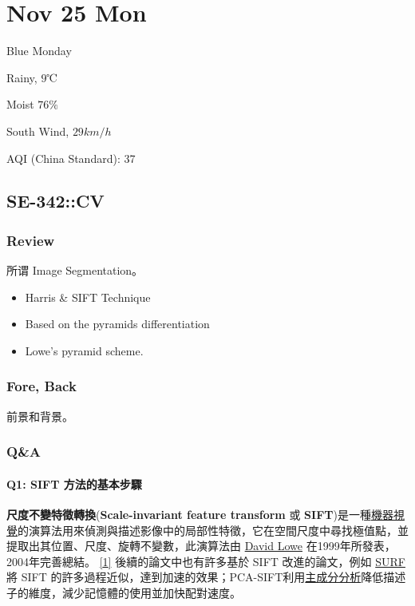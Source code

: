 \documentclass[
]{article}
\date{}
\begin{document}
\hypertarget{header-n0}{%
\section{Nov 25 Mon}\label{header-n0}}

Blue Monday

Rainy, \(9\)℃

Moist \(76\%\)

South Wind, \(29km/h\)

AQI (China Standard): 37

\hypertarget{header-n7}{%
\subsection{SE-342::CV}\label{header-n7}}

\hypertarget{header-n8}{%
\subsubsection{Review}\label{header-n8}}

所谓 Image Segmentation。

\begin{itemize}
\item
  Harris \& SIFT Technique
\item
  Based on the pyramids differentiation
\item
  Lowe's pyramid scheme.
\end{itemize}

\hypertarget{header-n17}{%
\subsubsection{Fore, Back}\label{header-n17}}

前景和背景。

\hypertarget{header-n19}{%
\subsubsection{Q\&A}\label{header-n19}}

\hypertarget{header-n20}{%
\paragraph{Q1: SIFT 方法的基本步驟}\label{header-n20}}

\textbf{尺度不變特徵轉換}(\textbf{Scale-invariant feature transform} 或
\textbf{SIFT})是一種\href{https://zh.wikipedia.org/wiki/机器视觉}{機器視覺}的演算法用來偵測與描述影像中的局部性特徵，它在空間尺度中尋找極值點，並提取出其位置、尺度、旋轉不變數，此演算法由
\href{https://zh.wikipedia.org/w/index.php?title=David_Lowe_(computer_scientist)\&action=edit\&redlink=1}{David
Lowe} 在1999年所發表，2004年完善總結。
\href{https://zh.wikipedia.org/wiki/\#cite_note-lowe99-1}{{[}1{]}}
後續的論文中也有許多基於 SIFT 改進的論文，例如
\href{https://zh.wikipedia.org/wiki/加速稳健特征}{SURF} 將 SIFT
的許多過程近似，達到加速的效果；PCA-SIFT利用\href{https://zh.wikipedia.org/wiki/主成分分析}{主成分分析}降低描述子的維度，減少記憶體的使用並加快配對速度。
\end{document}
